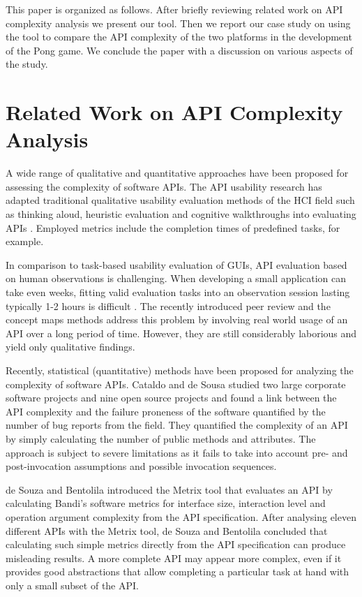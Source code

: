 \documentclass[conference]{IEEEtran}
\begin{document}
This paper is organized as follows. After briefly reviewing related
work on API complexity analysis we present our tool. Then we report
our case study on using the tool to compare the API complexity of the
two platforms in the development of the Pong game. We conclude the
paper with a discussion on various aspects of the study.

\section{Related Work on API Complexity Analysis}

A wide range of qualitative and quantitative approaches have been
proposed for assessing the complexity of software APIs. The API
usability research has adapted traditional qualitative usability
evaluation methods of the HCI field such as thinking aloud, heuristic
evaluation and cognitive walkthroughs into evaluating APIs
\cite{overview}. Employed metrics include the completion times of
predefined tasks, for example.

In comparison to task-based usability evaluation of GUIs, API
evaluation based on human observations is challenging. When developing
a small application can take even weeks, fitting valid evaluation tasks
into an observation session lasting typically 1-2 hours is difficult
\cite{conceptmaps}. The recently introduced peer review
\cite{apipeerreview} and the concept maps \cite{conceptmaps} methods
address this problem by involving real world usage of an API over a
long period of time. However, they are still considerably laborious
and yield only qualitative findings.

Recently, statistical (quantitative) methods have been proposed for
analyzing the complexity of software APIs. Cataldo and de Sousa
\cite{cmu-api_failures} studied two large corporate software projects
and nine open source projects and found a link between the API
complexity and the failure proneness of the software quantified by the
number of bug reports from the field. They quantified the complexity of
an API by simply calculating the number of public methods and
attributes. The approach is subject to severe limitations as it fails
to take into account pre- and post-invocation assumptions and possible
invocation sequences.

de Souza and Bentolila \cite{automatic-api-eval} introduced the Metrix
tool that evaluates an API by calculating Bandi’s software metrics for
interface size, interaction level and operation argument complexity
from the API specification. After analysing eleven different APIs with
the Metrix tool, de Souza and Bentolila concluded that calculating
such simple metrics directly from the API specification can produce
misleading results. A more complete API may appear more complex, even
if it provides good abstractions that allow completing a particular
task at hand with only a small subset of the API.
\end{document}
